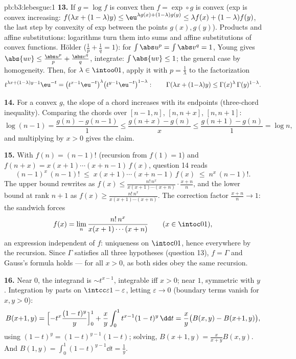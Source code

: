 \begin{solution}{pb:b3:lebesgue:1}
\textbf{13.} If $g = \log f$ is convex then $f = \exp\circ g$
is convex (exp is convex increasing: $f(\lambda x + (1-\lambda)
y) \leq \eu^{\lambda g(x) + (1-\lambda)g(y)} \leq \lambda f(x)
+ (1-\lambda)f(y)$, the last step by convexity of exp between
the points $g(x), g(y)$). Products and affine substitutions:
logarithms turn them into sums and affine substitutions of
convex functions. H\"older ($\frac1p + \frac1q = 1$): for
$\int\abs u^p = \int\abs v^q = 1$, Young gives $\abs{uv} \leq
\frac{\abs u^p}p + \frac{\abs v^q}q$, integrate: $\int\abs{uv}
\leq 1$; the general case by homogeneity. Then, for $\lambda
\in \intoo01$, apply it with $p = \frac1\lambda$ to the
factorization
\[
t^{\lambda x + (1-\lambda)y - 1}\eu^{-t}
= \bigl(t^{x-1}\eu^{-t}\bigr)^{\lambda}
\bigl(t^{y-1}\eu^{-t}\bigr)^{1-\lambda} :
\qquad
\Gamma(\lambda x + (1{-}\lambda)y) \leq
\Gamma(x)^\lambda\,\Gamma(y)^{1-\lambda} .
\]

\textbf{14.} For a convex $g$, the slope of a chord increases
with its endpoints (three-chord inequality). Comparing the
chords over $[n-1, n]$, $[n, n+x]$, $[n, n+1]$:
\[
\log(n-1) = \frac{g(n) - g(n-1)}1 \leq
\frac{g(n+x) - g(n)}x \leq \frac{g(n+1) - g(n)}1 = \log n,
\]
and multiplying by $x > 0$ gives the claim.

\textbf{15.} With $f(n) = (n-1)!$ (recursion from $f(1) = 1$)
and $f(n + x) = x(x+1)\cdots(x+n-1)\,f(x)$, question 14 reads
\[
(n-1)^x\,(n-1)! \;\leq\; x(x+1)\cdots(x+n-1)\,f(x)
\;\leq\; n^x\,(n-1)! .
\]
The upper bound rewrites as $f(x) \leq
\frac{n!\,n^x}{x(x+1)\cdots(x+n)}\cdot\frac{x+n}n$, and the
lower bound at rank $n+1$ as $f(x) \geq
\frac{n!\,n^x}{x(x+1)\cdots(x+n)}$. The correction factor
$\frac{x+n}n \to 1$: the sandwich forces
\[
f(x) = \lim_n\frac{n!\,n^x}{x(x+1)\cdots(x+n)}
\qquad (x \in \intoc01),
\]
an expression independent of $f$: uniqueness on $\intoc01$,
hence everywhere by the recursion. Since $\Gamma$ satisfies
all three hypotheses (question 13), $f = \Gamma$ and Gauss's
formula holds --- for all $x > 0$, as both sides obey the same
recursion.

\textbf{16.} Near $0$, the integrand is $\sim t^{x-1}$,
integrable iff $x > 0$; near $1$, symmetric with $y$.
Integration by parts on $\intcc\varepsilon{1-\varepsilon}$,
letting $\varepsilon \to 0$ (boundary terms vanish for $x, y >
0$):
\[
B(x{+}1, y) = \Bigl[-t^x\frac{(1-t)^y}y\Bigr]_0^1 +
\frac xy\int_0^1t^{x-1}(1-t)^y\,\dd t
= \frac xy\bigl(B(x, y) - B(x{+}1, y)\bigr),
\]
using $(1-t)^y = (1-t)^{y-1}(1 - t)$; solving, $B(x+1, y) =
\frac{x}{x+y}B(x, y)$. And $B(1, y) =
\int_0^1(1-t)^{y-1}\dd t = \frac1y$.


\end{solution}
